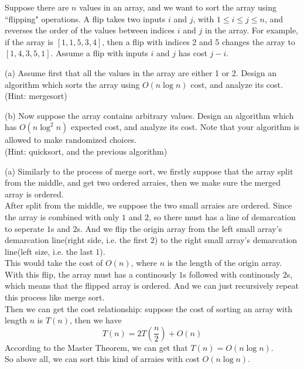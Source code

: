 \problem{}
Suppose there are $n$ values in an array, and we want to sort the array using ``flipping" operations.  A flip takes two inputs $i$ and $j$, with $1 \leq i \leq j \leq n$, and reverses the order of the values between indices $i$ and $j$ in the array.  For example, if the array is $[1,1,5,3,4]$, then a flip with indices 2 and 5 changes the array to $[1,4,3,5,1]$.  Assume a flip with inputs $i$ and $j$ has cost $j-i$.  

\hspace*{\fill}

\noindent (a) Assume first that all the values in the array are either 1 or 2.  Design an algorithm which sorts the array using $O(n \log n)$ cost, and analyze its cost.  \\
(Hint: mergesort)

\hspace*{\fill}

\noindent (b) Now suppose the array contains arbitrary values.   Design an algorithm which has $O(n \log^2 n)$ expected cost, and analyze its cost.  Note that your algorithm is allowed to make randomized choices. \\
(Hint: quicksort, and the previous algorithm)

\solution{}

(a) Similarly to the process of merge sort, we firstly suppose that the array split from the middle, and get two ordered arraies, then we make sure the merged array is ordered.\\
After split from the middle, we suppose the two small arraies are ordered. Since the array is combined with only $1$ and $2$, so there must has a line of demarcation to seperate $1$s and $2$s.
And we flip the origin array from the left small array's demarcation line(right side, i.e. the first $2$) to the right small array's demarcation line(left size, i.e. the last $1$).\\
This would take the cost of $O(n)$, where $n$ is the length of the origin array.\\
With this flip, the array must has a continously $1$s followed with continously $2$s, which means that the flipped array is ordered. And we can just recursively repeat this process like merge sort.\\

Then we can get the cost relationship: suppose the cost of sorting an array with length $n$ is $T(n)$, then we have
$$T(n)=2T\left(\dfrac{n}{2}\right)+O(n)$$
According to the Master Theorem, we can get that $T(n)=O(n\log n)$.\\
So above all, we can sort this kind of arraies with cost $O(n\log n)$.

